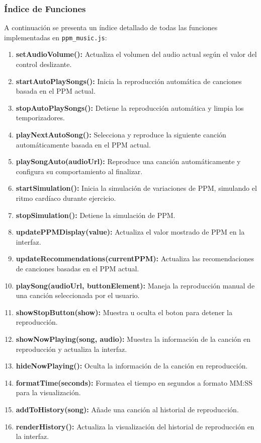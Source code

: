 \documentclass[a4paper,12pt]{article}
\begin{document}
\subsubsection{Índice de Funciones}
A continuación se presenta un índice detallado de todas las funciones implementadas en \texttt{ppm\_music.js}:

\begin{enumerate}
    \item \textbf{setAudioVolume():} Actualiza el volumen del audio actual según el valor del control deslizante.
    \item \textbf{startAutoPlaySongs():} Inicia la reproducción automática de canciones basada en el PPM actual.
    \item \textbf{stopAutoPlaySongs():} Detiene la reproducción automática y limpia los temporizadores.
    \item \textbf{playNextAutoSong():} Selecciona y reproduce la siguiente canción automáticamente basada en el PPM actual.
    \item \textbf{playSongAuto(audioUrl):} Reproduce una canción automáticamente y configura su comportamiento al finalizar.
    \item \textbf{startSimulation():} Inicia la simulación de variaciones de PPM, simulando el ritmo cardíaco durante ejercicio.
    \item \textbf{stopSimulation():} Detiene la simulación de PPM.
    \item \textbf{updatePPMDisplay(value):} Actualiza el valor mostrado de PPM en la interfaz.
    \item \textbf{updateRecommendations(currentPPM):} Actualiza las recomendaciones de canciones basadas en el PPM actual.
    \item \textbf{playSong(audioUrl, buttonElement):} Maneja la reproducción manual de una canción seleccionada por el usuario.
    \item \textbf{showStopButton(show):} Muestra u oculta el boton para detener la reproducción.
    \item \textbf{showNowPlaying(song, audio):} Muestra la información de la canción en reproducción y actualiza la interfaz.
    \item \textbf{hideNowPlaying():} Oculta la información de la canción en reproducción.
    \item \textbf{formatTime(seconds):} Formatea el tiempo en segundos a formato MM:SS para la visualización.
    \item \textbf{addToHistory(song):} Añade una canción al historial de reproducción.
    \item \textbf{renderHistory():} Actualiza la visualización del historial de reproducción en la interfaz.
\end{enumerate}
\end{document}
